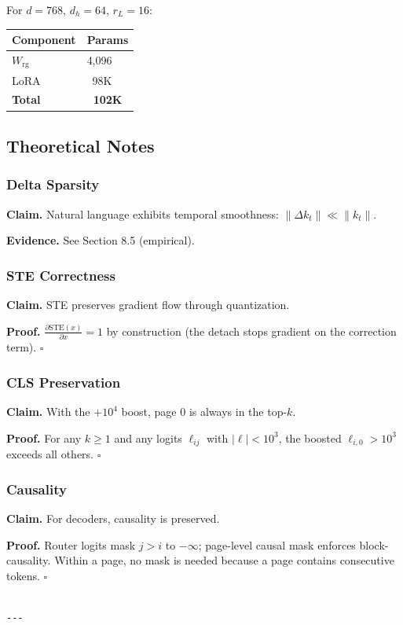 For $d = 768$, $d_h = 64$, $r_L = 16$:

\begin{table}[H]
\centering
\small
\begin{tabular}{ll}
\toprule
\textbf{Component} & \textbf{Params} \\
\midrule
$W_\text{rg}$ & 4,096 \\
LoRA & ~98K \\
\textbf{Total} & \textbf{~102K} \\
\bottomrule
\end{tabular}
\end{table}

\subsection{Theoretical Notes}

\subsubsection{Delta Sparsity}

\textbf{Claim.} Natural language exhibits temporal smoothness: 
$\|\Delta k_t\| \ll \|k_t\|$.

\textbf{Evidence.} See Section 8.5 (empirical).

\subsubsection{STE Correctness}

\textbf{Claim.} STE preserves gradient flow through quantization.

\textbf{Proof.} $\frac{\partial \text{STE}(x)}{\partial x} = 1$ by construction 
(the detach stops gradient on the correction term). $\square$

\subsubsection{CLS Preservation}

\textbf{Claim.} With the $+10^4$ boost, page 0 is always in the top-$k$.

\textbf{Proof.} For any $k \geq 1$ and any logits $\ell_{ij}$ with $|\ell| < 10^3$, 
the boosted $\ell_{i, 0} > 10^3$ exceeds all others. $\square$

\subsubsection{Causality}

\textbf{Claim.} For decoders, causality is preserved.

\textbf{Proof.} Router logits mask $j > i$ to $-\infty$; page-level causal mask 
enforces block-causality. Within a page, no mask is needed because a page 
contains consecutive tokens. $\square$
\begin{lstlisting}

---
\end{lstlisting}